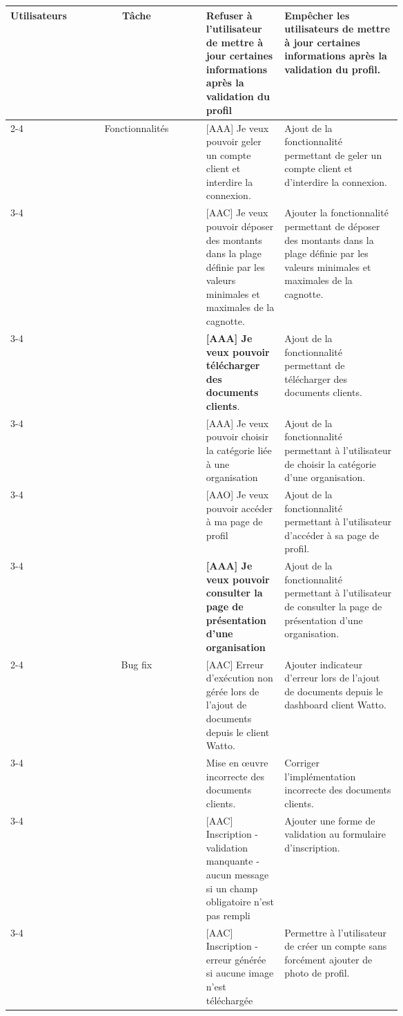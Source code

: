 \documentclass[../main.tex]{subfiles}
\begin{document}
\begin{longtable}{|p{0.165\linewidth} |c| p{0.20\linewidth}| p{0.30\linewidth}|}
    
    \multirow{3}{*}{\textbf{Utilisateurs}} &
    Tâche & 
    Refuser à l'utilisateur de mettre à jour certaines informations après la validation du profil
    & Empêcher les utilisateurs de mettre à jour certaines informations après la validation du profil. \\
    \cline{2-4}
    &
    \multirow{2}{*}{Fonctionnalités} &
    [AAA] Je veux pouvoir geler un compte client et interdire la connexion.
    & Ajout de la fonctionnalité permettant de geler un compte client et d'interdire la connexion. \\
    \cline{3-4}
    & 
    &
    [AAC] Je veux pouvoir déposer des montants dans la plage définie par les valeurs minimales et maximales de la cagnotte.
    & Ajouter la fonctionnalité permettant de déposer des montants dans la plage définie par les valeurs minimales et maximales de la cagnotte. \\
    \cline{3-4}
    & 
    &
    \textbf{[AAA] Je veux pouvoir télécharger des documents clients}.
    & Ajout de la fonctionnalité permettant de télécharger des documents clients. \\
    \cline{3-4}
    & 
    &
    [AAA] Je veux pouvoir choisir la catégorie liée à une organisation
    & Ajout de la fonctionnalité permettant à l'utilisateur de choisir la catégorie d'une organisation. \\
    \cline{3-4}
    & 
    &
    [AAO] Je veux pouvoir accéder à ma page de profil
    & Ajout de la fonctionnalité permettant à l'utilisateur d'accéder à sa page de profil. \\
    \cline{3-4}
    & 
    &
    \textbf{[AAA] Je veux pouvoir consulter la page de présentation d'une organisation}
    & Ajout de la fonctionnalité permettant à l'utilisateur de consulter la page de présentation d'une organisation. \\
    \cline{2-4}
    &
    \multirow{2}{*}{Bug fix} & 
    [AAC] Erreur d'exécution non gérée lors de l'ajout de documents depuis le client Watto.
    & Ajouter indicateur d'erreur lors de l'ajout de documents depuis le dashboard client Watto. \\
    \cline{3-4}
    & 
    &
    Mise en œuvre incorrecte des documents clients.
    & Corriger l'implémentation incorrecte des documents clients. \\
    \cline{3-4}
    & 
    &
    [AAC] Inscription - validation manquante - aucun message si un champ obligatoire n'est pas rempli
    & Ajouter une forme de validation au formulaire d'inscription.\\
    \cline{3-4}
    & 
    &
    [AAC] Inscription - erreur générée si aucune image n'est téléchargée
    & Permettre à l'utilisateur de créer un compte sans forcément ajouter de photo de profil. \\
    \hline


\end{longtable}
\end{document}
